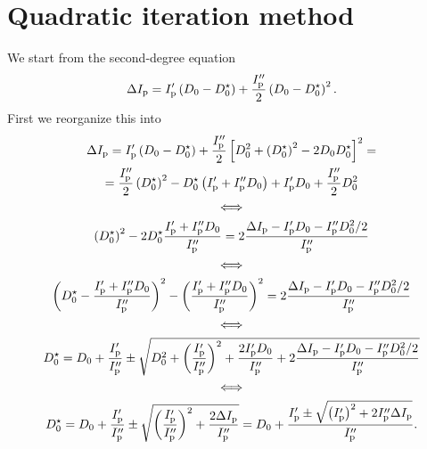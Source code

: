 \documentclass{notes}
\begin{document}
	\section{Quadratic iteration method}
	We start from the second-degree equation
	\begin{equation}
		\Delta I_{\rm p} = I_{\rm p}'\left(D_0-D_0^\star\right) +
			\frac{I_{\rm p}''}{2}\left(D_0-D_0^\star\right)^2.
	\end{equation}
	First we reorganize this into
	\begin{equation}
		\begin{gathered}
			\Delta I_{\rm p} =
			I_{\rm p}'\left(D_0-D_0^\star\right) +
			\frac{I_{\rm p}''}{2}\left[
				D_0^2+\left(D_0^\star\right)^2 - 2D_0D_0^\star
			\right]^2
			=\\
			= \frac{I_{\rm p}''}{2}\left(D_0^\star\right)^2 -
			D_0^\star\left( I_{\rm p}' + I_{\rm p}''D_0 \right) +
			I_{\rm p}'D_0 + \frac{I_{\rm p}''}{2}D_0^2\\
			\Longleftrightarrow\\
			\left(D_0^\star\right)^2 - 2D_0^\star\frac{I_{\rm p}'+I_{\rm p}''D_0}{I_{\rm p}''} =
			2\frac{\Delta I_{\rm p} - I_{\rm p}'D_0 - I_{\rm p}''D_0^2/2}{I_{\rm p}''}\\
			\Longleftrightarrow\\
			\left(D_0^\star-\frac{I_{\rm p}'+I_{\rm p}''D_0}{I_{\rm p}''}\right)^2
			- \left(\frac{I_{\rm p}'+I_{\rm p}''D_0}{I_{\rm p}''}\right)^2 =
			2\frac{\Delta I_{\rm p} - I_{\rm p}'D_0 - I_{\rm p}''D_0^2/2}
			{I_{\rm p}''}\\
			\Longleftrightarrow\\
			D_0^\star = D_0 + \frac{I_{\rm p}'}{I_{\rm p}''}\pm
				\sqrt{
					D_0^2 +
					\left(\frac{I_{\rm p}'}{I_{\rm p}''}\right)^2 +
					\frac{2I_{\rm p}'D_0}{I_{\rm p}''} +
					2\frac{\Delta I_{\rm p} - I_{\rm p}'D_0 - I_{\rm p}''D_0^2/2}
					{I_{\rm p}''}
				}\\
			\Longleftrightarrow\\
			D_0^\star =
				D_0 + \frac{I_{\rm p}'}{I_{\rm p}''} \pm
				\sqrt{
					\left(\frac{I_{\rm p}'}{I_{\rm p}''}\right)^2 +
					\frac{2\Delta I_{\rm p}}{I_{\rm p}''}
				}
				=
				D_0 + \frac{I_{\rm p}'\pm\sqrt{
					\left(I_{\rm p}'\right)^2+2I_{\rm p}''\Delta I_{\rm p}
				}}{I_{\rm p}''}.
		\end{gathered}
	\end{equation}
\end{document}

